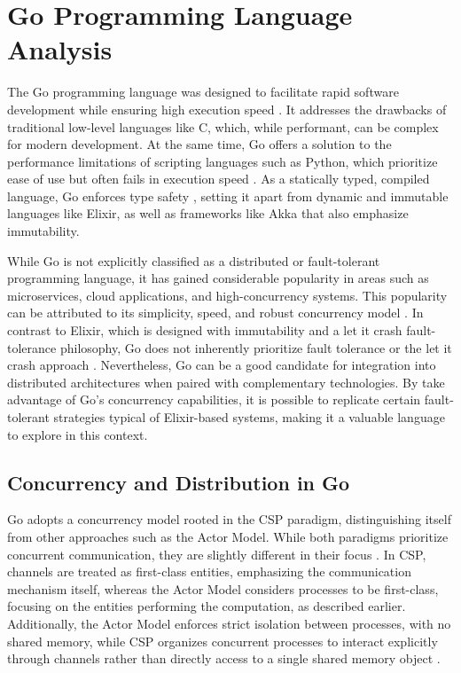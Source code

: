 \section{Go Programming Language Analysis}

The Go programming language was designed to facilitate rapid software development while ensuring high execution speed \cite{Kennedy2016, Cox-Buday2017}. It addresses the drawbacks of traditional low-level languages like C, which, while performant, can be complex for modern development. At the same time, Go offers a solution to the performance limitations of scripting languages such as Python, which prioritize ease of use but often fails in execution speed \cite{Kennedy2016}. As a statically typed, compiled language, Go enforces type safety \cite{go-docs}, setting it apart from dynamic and immutable languages like Elixir, as well as frameworks like Akka that also emphasize immutability.

While Go is not explicitly classified as a distributed or fault-tolerant programming language, it has gained considerable popularity in areas such as microservices, cloud applications, and high-concurrency systems. This popularity can be attributed to its simplicity, speed, and robust concurrency model \cite{Castro2019,Shuiskov2022}. In contrast to Elixir, which is designed with immutability and a let it crash fault-tolerance philosophy, Go does not inherently prioritize fault tolerance or the let it crash approach \cite{Cox-Buday2017}. Nevertheless, Go can be a good candidate for integration into distributed architectures when paired with complementary technologies. By take advantage of Go’s concurrency capabilities, it is possible to replicate certain fault-tolerant strategies typical of Elixir-based systems, making it a valuable language to explore in this context.

\subsection{Concurrency and Distribution in Go}

Go adopts a concurrency model rooted in the \gls{CSP} paradigm, distinguishing itself from other approaches such as the Actor Model. While both paradigms prioritize concurrent communication, they are slightly different in their focus \cite{Cox-Buday2017}. In \gls{CSP}, channels are treated as first-class entities, emphasizing the communication mechanism itself, whereas the Actor Model considers processes to be first-class, focusing on the entities performing the computation, as described earlier. Additionally, the Actor Model enforces strict isolation between processes, with no shared memory, while CSP organizes concurrent processes to interact explicitly through channels rather than directly access to a single shared memory object \cite{Cox-Buday2017}. 

